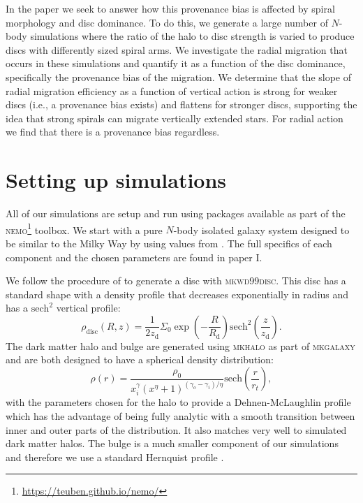 In the paper we seek to answer how this provenance bias is affected by spiral morphology and disc dominance. To do this, we generate a large number of $N$-body simulations where the ratio of the halo to disc strength is varied to produce discs with differently sized spiral arms. We investigate the radial migration that occurs in these simulations and quantify it as a function of the disc dominance, specifically the provenance bias of the migration. We determine that the slope of radial migration efficiency as a function of vertical action is strong for weaker discs (i.e., a provenance bias exists) and flattens for stronger discs, supporting the idea that strong spirals can migrate vertically extended stars. For radial action we find that there is a provenance bias regardless. 

\section{Setting up simulations}\label{sec:p1-simulations}
All of our simulations are setup and run using packages available as part of the \textsc{nemo}\footnote{\url{https://teuben.github.io/nemo/}}\citep{teuben:95} toolbox. We start with a pure $N$-body isolated galaxy system designed to be similar to the Milky Way by using values from \cite{mcmillan:17}. The full specifics of each component and the chosen parameters are found in paper I.

We follow the procedure of \cite{mcmillan:07} to generate a disc with \textsc{mkwd99disc}. This disc has a standard shape with a density profile that decreases exponentially in radius and has a $\mathrm{sech}^2$ vertical profile:
\begin{equation}
    \rho_\mathrm{disc}(R, z) = \frac{1}{2z_\mathrm{d}} \Sigma_0 \exp\left(-\frac{R}{R_\mathrm{d}}\right) \mathrm{sech}^2\left(\frac{z}{z_\mathrm{d}}\right).
\end{equation}
The dark matter halo and bulge are generated using \textsc{mkhalo} as part of \textsc{mkgalaxy} and are both designed to have a spherical density distribution:
\begin{equation}
    \rho(r) = \frac{\rho_0}{x^\gamma_i(x^\eta + 1)^{(\gamma_o - \gamma_i)/\eta}} \mathrm{sech}\left(\frac{r}{r_t}\right),
\end{equation}
with the parameters chosen for the halo to provide a Dehnen-McLaughlin profile \citep{dehnen:05} which has the advantage of being fully analytic with a smooth transition between inner and outer parts of the distribution. It also matches very well to simulated dark matter halos. The bulge is a much smaller component of our simulations and therefore we use a standard Hernquist profile \citep{hernquist:90}.

